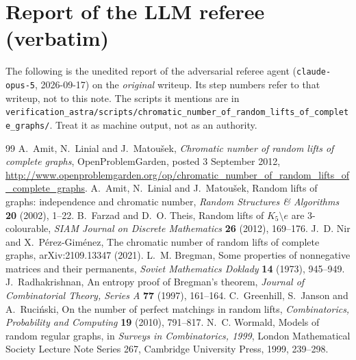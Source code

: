 \documentclass[11pt,a4paper]{article}
\theoremstyle{plain}
\theoremstyle{definition}
\theoremstyle{remark}
\begin{document}
\section{Report of the LLM referee (verbatim)}\label{app:referee}

\begin{tcolorbox}[colback=gray!8,colframe=gray!50,boxrule=0.4pt,arc=2pt]
\small The following is the unedited report of the adversarial referee agent
(\texttt{claude-opus-5}, 2026-09-17) on the \emph{original} writeup. Its step numbers
refer to that writeup, not to this note. The scripts it mentions are in
\texttt{verification\_astra/scripts/chromatic\_number\_of\_random\_lifts\_of\_complete\_graphs/}.
Treat it as machine output, not as an authority.
\end{tcolorbox}



\begin{thebibliography}{99}
\small
\setlength{\itemsep}{2pt}
 A.~Amit, N.~Linial and J.~Matoušek, \emph{Chromatic number of random lifts of complete graphs}, OpenProblemGarden, posted 3 September 2012, \url{http://www.openproblemgarden.org/op/chromatic_number_of_random_lifts_of_complete_graphs}.
 A.~Amit, N.~Linial and J.~Matoušek, Random lifts of graphs: independence and chromatic number, \emph{Random Structures \& Algorithms} \textbf{20} (2002), 1--22.
 B.~Farzad and D.~O. Theis, Random lifts of $K_5\setminus e$ are 3-colourable, \emph{SIAM Journal on Discrete Mathematics} \textbf{26} (2012), 169--176.
 J.~D. Nir and X.~Pérez-Giménez, The chromatic number of random lifts of complete graphs, arXiv:2109.13347 (2021).
 L.~M. Bregman, Some properties of nonnegative matrices and their permanents, \emph{Soviet Mathematics Doklady} \textbf{14} (1973), 945--949.
 J.~Radhakrishnan, An entropy proof of Bregman's theorem, \emph{Journal of Combinatorial Theory, Series A} \textbf{77} (1997), 161--164.
 C.~Greenhill, S.~Janson and A.~Ruciński, On the number of perfect matchings in random lifts, \emph{Combinatorics, Probability and Computing} \textbf{19} (2010), 791--817.
 N.~C. Wormald, Models of random regular graphs, in \emph{Surveys in Combinatorics, 1999}, London Mathematical Society Lecture Note Series 267, Cambridge University Press, 1999, 239--298.
\end{thebibliography}
\end{document}
